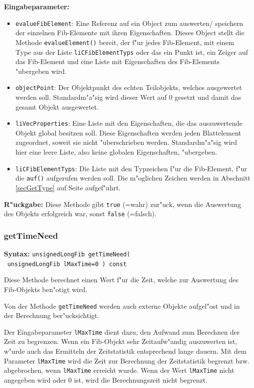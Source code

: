 \bigskip\noindent
\textbf{Eingabeparameter:} 
\begin{itemize}
 \item \verb|evalueFibElement|: Eine Referenz auf ein Object zum auswerten/ speichern der einzelnen Fib-Elemente mit ihren Eigenschaften. Dieses Object stellt die Methode \verb|evalueElement()| bereit, der f"ur jedes Fib-Element, mit einem Type aus der Liste \verb|liCFibElementTyps| oder das ein Punkt ist, ein Zeiger auf das Fib-Element und eine Liste mit Eigenschaften des Fib-Elements "ubergeben wird.
 \item \verb|objectPoint|: Der Objektpunkt des echten Teilobjekts, welches ausgewertet werden soll. Standardm"a"sig wird dieser Wert auf $0$ gesetzt und damit das gesamt Objekt ausgewertet.
 \item \verb|liVecProperties|: Eine Liste mit den Eigenschaften, die das auszuwertende Objekt global besitzen soll. Diese Eigenschaften werden jeden Blattelement zugeordnet, soweit sie nicht "uberschrieben werden. Standardm"a"sig wird hier eine leere Liste, also keine globalen Eigenschaften, "ubergeben.
 \item \verb|liCFibElementTyps|: Die Liste mit den Typzeichen f"ur die Fib-Element, f"ur die \verb|auf()| aufgerufen werden soll. Die m"oglichen Zeichen werden in Abschnitt \ref{secGetType} auf Seite \pageref{secGetType} aufgef"uhrt.
\end{itemize}

\bigskip\noindent
\textbf{R"uckgabe:} Diese Methode gibt \verb|true| (=wahr) zur"uck, wenn die Auswertung des Objekts erfolgreich war, sonst \verb|false| (=falsch).


\subsubsection{getTimeNeed}

\textbf{Syntax:} \verb|unsignedLongFib getTimeNeed( | \\\verb| unsignedLongFib lMaxTime=0 ) const|

\bigskip\noindent
Diese Methode berechnet einen Wert f"ur die Zeit, welche zur Auswertung des Fib-Objekts ben"otigt wird.

Von der Methode \verb|getTimeNeed| werden auch externe Objekte aufgel"ost und in der Berechnung ber"ucksichtigt.

Der Eingabeparameter \verb|lMaxTime| dient dazu, den Aufwand zum Berechnen der Zeit zu begrenzen. Wenn ein Fib-Objekt sehr Zeitaufw"andig auszuwerten ist, w"urde auch das Ermitteln der Zeitstatistik entsprechend lange dauern. Mit dem Parameter \verb|lMaxTime| wird die Zeit zur Berechnung der Zeitstatistik begrenzt bzw. abgebrochen, wenn \verb|lMaxTime| erreicht wurde. Wenn der Wert \verb|lMaxTime| nicht angegeben wird oder $0$ ist, wird die Berechnungszeit nicht begrenzt.

